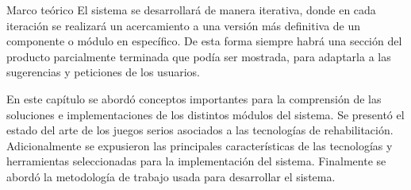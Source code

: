 \begin{thesischapter}{1} {Marco teórico}
    \vspace{2pt}
    El sistema se desarrollará de manera iterativa, donde en cada iteración se realizará un acercamiento a una versión más definitiva de un componente o módulo en específico. De esta forma siempre habrá una sección del producto parcialmente terminada que podía ser mostrada, para adaptarla a las sugerencias y peticiones de los usuarios.

    En este capítulo se abordó conceptos importantes para la comprensión de las soluciones e implementaciones de los distintos módulos del sistema. Se presentó el estado del arte de los juegos serios asociados a las tecnologías de rehabilitación. Adicionalmente se expusieron las principales características de las tecnologías y herramientas seleccionadas para la implementación del sistema. Finalmente se abordó la metodología de trabajo usada para desarrollar el sistema. 
\end{thesischapter}